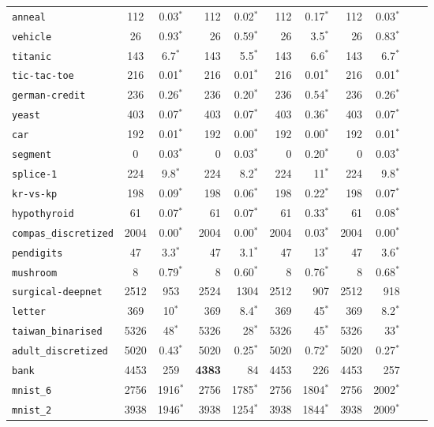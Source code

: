 \begin{tabular}{lccrrrrrrrr}
\texttt{anneal} & 112 & 0.03$^*$ & 112 & 0.02$^*$ & 112 & 0.17$^*$ & 112 & 0.03$^*$\\
\texttt{vehicle} & 26 & 0.93$^*$ & 26 & 0.59$^*$ & 26 & 3.5$^*$ & 26 & 0.83$^*$\\
\texttt{titanic} & 143 & 6.7$^*$ & 143 & 5.5$^*$ & 143 & 6.6$^*$ & 143 & 6.7$^*$\\
\texttt{tic-tac-toe} & 216 & 0.01$^*$ & 216 & 0.01$^*$ & 216 & 0.01$^*$ & 216 & 0.01$^*$\\
\texttt{german-credit} & 236 & 0.26$^*$ & 236 & 0.20$^*$ & 236 & 0.54$^*$ & 236 & 0.26$^*$\\
\texttt{yeast} & 403 & 0.07$^*$ & 403 & 0.07$^*$ & 403 & 0.36$^*$ & 403 & 0.07$^*$\\
\texttt{car} & 192 & 0.01$^*$ & 192 & 0.00$^*$ & 192 & 0.00$^*$ & 192 & 0.01$^*$\\
\texttt{segment} & 0 & 0.03$^*$ & 0 & 0.03$^*$ & 0 & 0.20$^*$ & 0 & 0.03$^*$\\
\texttt{splice-1} & 224 & 9.8$^*$ & 224 & 8.2$^*$ & 224 & 11$^*$ & 224 & 9.8$^*$\\
\texttt{kr-vs-kp} & 198 & 0.09$^*$ & 198 & 0.06$^*$ & 198 & 0.22$^*$ & 198 & 0.07$^*$\\
\texttt{hypothyroid} & 61 & 0.07$^*$ & 61 & 0.07$^*$ & 61 & 0.33$^*$ & 61 & 0.08$^*$\\
\texttt{compas\_discretized} & 2004 & 0.00$^*$ & 2004 & 0.00$^*$ & 2004 & 0.03$^*$ & 2004 & 0.00$^*$\\
\texttt{pendigits} & 47 & 3.3$^*$ & 47 & 3.1$^*$ & 47 & 13$^*$ & 47 & 3.6$^*$\\
\texttt{mushroom} & 8 & 0.79$^*$ & 8 & 0.60$^*$ & 8 & 0.76$^*$ & 8 & 0.68$^*$\\
\texttt{surgical-deepnet} & 2512 & 953 & 2524 & 1304 & 2512 & 907 & 2512 & 918\\
\texttt{letter} & 369 & 10$^*$ & 369 & 8.4$^*$ & 369 & 45$^*$ & 369 & 8.2$^*$\\
\texttt{taiwan\_binarised} & 5326 & 48$^*$ & 5326 & 28$^*$ & 5326 & 45$^*$ & 5326 & 33$^*$\\
\texttt{adult\_discretized} & 5020 & 0.43$^*$ & 5020 & 0.25$^*$ & 5020 & 0.72$^*$ & 5020 & 0.27$^*$\\
\texttt{bank} & 4453 & 259 & \textbf{4383} & 84 & 4453 & 226 & 4453 & 257\\
\texttt{mnist\_6} & 2756 & 1916$^*$ & 2756 & 1785$^*$ & 2756 & 1804$^*$ & 2756 & 2002$^*$\\
\texttt{mnist\_2} & 3938 & 1946$^*$ & 3938 & 1254$^*$ & 3938 & 1844$^*$ & 3938 & 2009$^*$\\

\end{tabular}
